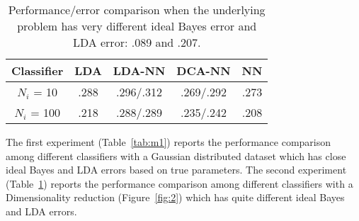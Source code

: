 \documentclass[12pt]{article}
\begin{document}
\newpage

\begin{table}[h]
\caption{Performance/error comparison when the underlying problem has very different ideal Bayes error and LDA error: .089 and .207.}
\label{tab:m2}
\vspace{10pt}
\centering
\begin{tabular}{|c|c|c|c|c|}
\hline
Classifier & LDA & LDA-NN & DCA-NN & NN \\
\hline
$N_i$ = 10 & .288 & .296/.312 & .269/.292 & .273 \\
\hline
$N_i$ = 100 & .218 & .288/.289 & .235/.242 & .208 \\
\hline
\end{tabular}
\end{table}
The first experiment (Table~\ref{tab:m1}) reports the performance comparison among different
classifiers with a Gaussian distributed dataset which has close ideal Bayes and LDA errors based
on true parameters. The second experiment (Table~\ref{tab:m2}) reports the performance comparison among
different classifiers with a Dimensionality reduction (Figure~\ref{fig:2}) which has quite different ideal Bayes and LDA errors.
\end{document}
